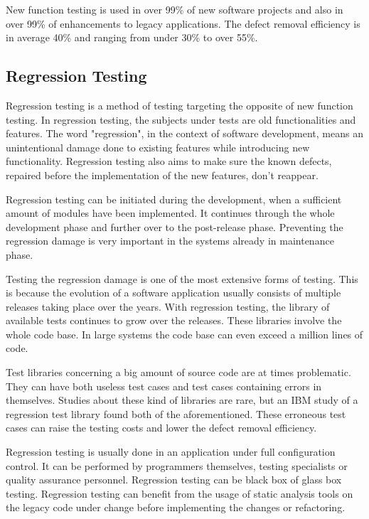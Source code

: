 New function testing is used in over 99\% of new software projects and also in over 99\% of enhancements to legacy applications. The defect removal efficiency is in average 40\% and ranging from under 30\% to over 55\%. 

 \subsection{Regression Testing}

Regression testing is a method of testing targeting the opposite of new function testing. In regression testing, the subjects under tests are old functionalities and features. The word "regression", in the context of software development, means an unintentional damage done to existing features while introducing new functionality. Regression testing also aims to make sure the known defects, repaired before the implementation of the new features, don't reappear.

Regression testing can be initiated during the development, when a sufficient amount of modules have been implemented. It continues through the whole development phase and further over to the post-release phase. Preventing the regression damage is very important in the systems already in maintenance phase.

Testing the regression damage is one of the most extensive forms of testing. This is because the evolution of a software application usually consists of multiple releases taking place over the years. With regression testing, the library of available tests continues to grow over the releases. These libraries involve the whole code base. In large systems the code base can even exceed a million lines of code.

Test libraries concerning a big amount of source code are at times problematic. They can have both useless test cases and test cases containing errors in themselves. Studies about these kind of libraries are rare, but an IBM study of a regression test library found both of the aforementioned. These erroneous test cases can raise the testing costs and lower the defect removal efficiency.

Regression testing is usually done in an application under full configuration control. It can be performed by programmers themselves, testing specialists or quality assurance personnel. Regression testing can be black box of glass box testing. Regression testing can benefit from the usage of static analysis tools on the legacy code under change before implementing the changes or refactoring.

